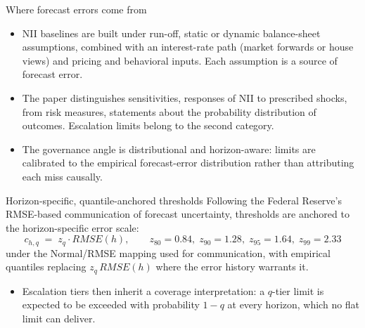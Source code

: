 \documentclass[aspectratio=169,11pt]{beamer}
\begin{document}
\begin{frame}{Where forecast errors come from}
  \begin{itemize}
    \item NII baselines are built under run-off, static or dynamic
          balance-sheet assumptions, combined with an interest-rate path
          (market forwards or house views) and pricing and behavioral
          inputs. Each assumption is a source of forecast error.
    \item The paper distinguishes sensitivities, responses of NII to
          prescribed shocks, from risk measures, statements about the
          probability distribution of outcomes. Escalation limits belong to
          the second category.
    \item The governance angle is distributional and horizon-aware: limits
          are calibrated to the empirical forecast-error distribution rather
          than attributing each miss causally.
  \end{itemize}
\end{frame}

\begin{frame}{Horizon-specific, quantile-anchored thresholds}
  \small Following the Federal Reserve's RMSE-based communication of forecast
  uncertainty, thresholds are anchored to the horizon-specific error scale:
  \[ c_{h,q} \;=\; z_q \cdot RMSE(h),
     \qquad z_{80}=0.84,\; z_{90}=1.28,\; z_{95}=1.64,\; z_{99}=2.33 \]
  under the Normal/RMSE mapping used for communication, with empirical
  quantiles replacing $z_q\,RMSE(h)$ where the error history warrants it.
  \begin{itemize}
    \item Escalation tiers then inherit a coverage interpretation: a
          $q$-tier limit is expected to be exceeded with probability $1-q$
          at every horizon, which no flat limit can deliver.
  \end{itemize}
\end{frame}
\end{document}
